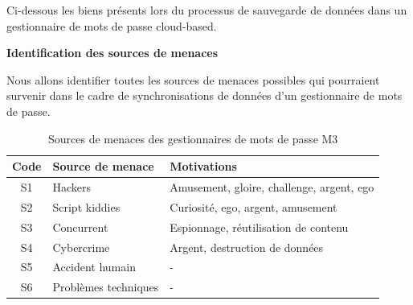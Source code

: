 Ci-dessous les biens présents lors du processus de sauvegarde de données dans un gestionnaire de mots de passe cloud-based.

\begin{table}[H]
	\centering
	\caption{Biens des gestionnaires de mots de passe M3}
\end{table}
\textbf{Identification des sources de menaces}

Nous allons identifier toutes les sources de menaces possibles qui pourraient survenir dans le cadre de synchronisations de données d'un gestionnaire de mots de passe. 

\begin{table}[H]
	\centering
	\begin{tabular}{cll}
		\hline
		Code & Source de menace                & Motivations                               \\ \hline
		S1   & Hackers & Amusement, gloire, challenge, argent, ego \\
		S2   & Script kiddies                  & Curiosité, ego, argent, amusement         \\
		S3   & Concurrent                      & Espionnage, réutilisation de contenu      \\
		S4   & Cybercrime                      & Argent, destruction de données            \\
		S5   & Accident humain                 & -                                         \\
		S6   & Problèmes techniques            & -                                         \\ \hline
	\end{tabular}
	\caption{Sources de menaces des gestionnaires de mots de passe M3}
\end{table}

